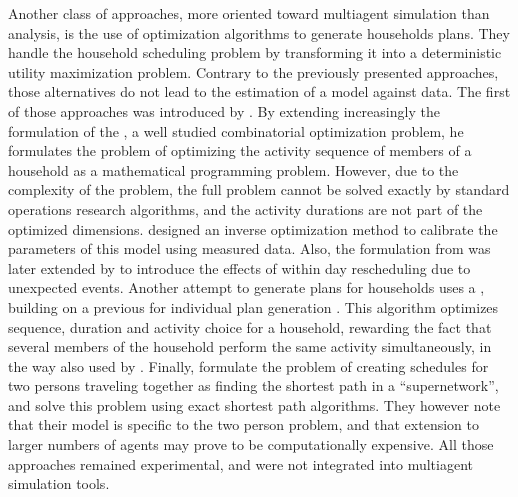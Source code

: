 {%
Another class of approaches,
more oriented toward multiagent simulation than analysis,
is the use of optimization algorithms to generate households plans.
They handle the household scheduling problem by transforming it into a deterministic utility maximization problem.
Contrary to the previously presented approaches,
those alternatives do not lead to the estimation of a model against data.
%
The first of those approaches was introduced by .
By extending increasingly the formulation of the \pudptw, a well studied combinatorial optimization problem,
he formulates the problem of optimizing the activity sequence of members of a household
as a mathematical programming problem.
However, due to the complexity of the problem,
the full problem cannot be solved exactly by standard operations research algorithms,
and the activity durations are not part of the optimized dimensions.
 designed an inverse optimization method
to calibrate the parameters of this model
using measured data.
Also, the formulation from 
was later extended by 
to introduce the effects of within day rescheduling due to unexpected events.
%
Another attempt to generate plans for households uses a \ga,
building on a previous \ga for individual plan generation
\cite{CharyparNagel_Transportation_2005,MeisterEtAl_Transportation_2005}.
This algorithm optimizes sequence, duration and activity choice for a household,
rewarding the fact that several members of the household perform the same activity
simultaneously, in the way also used by .
%
Finally,  formulate the problem of creating
schedules for two persons traveling together as finding the shortest path
in a ``supernetwork'', and solve this problem using exact shortest path algorithms.
They however note that their model is specific to the two person problem,
and that extension to larger numbers of agents may prove to be computationally expensive.
%
All those approaches remained experimental,
and were not integrated into multiagent simulation tools.

}
